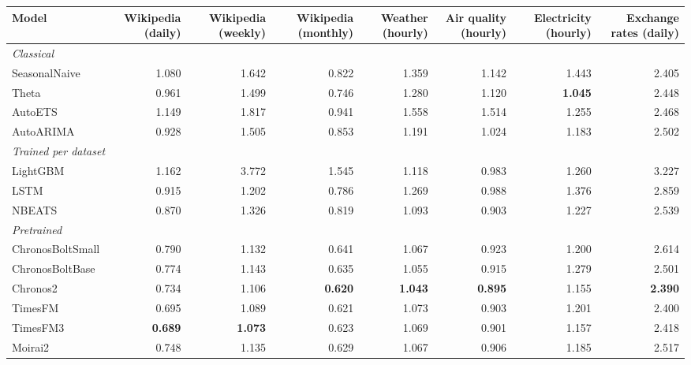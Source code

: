 \begin{tabular}{lrrrrrrr}
\toprule
Model & Wikipedia (daily) & Wikipedia (weekly) & Wikipedia (monthly) & Weather (hourly) & Air quality (hourly) & Electricity (hourly) & Exchange rates (daily) \\
\midrule
\multicolumn{8}{l}{\emph{Classical}} \\
\quad SeasonalNaive & 1.080 & 1.642 & 0.822 & 1.359 & 1.142 & 1.443 & 2.405 \\
\quad Theta & 0.961 & 1.499 & 0.746 & 1.280 & 1.120 & \textbf{1.045} & 2.448 \\
\quad AutoETS & 1.149 & 1.817 & 0.941 & 1.558 & 1.514 & 1.255 & 2.468 \\
\quad AutoARIMA & 0.928 & 1.505 & 0.853 & 1.191 & 1.024 & 1.183 & 2.502 \\
\multicolumn{8}{l}{\emph{Trained per dataset}} \\
\quad LightGBM & 1.162 & 3.772 & 1.545 & 1.118 & 0.983 & 1.260 & 3.227 \\
\quad LSTM & 0.915 & 1.202 & 0.786 & 1.269 & 0.988 & 1.376 & 2.859 \\
\quad NBEATS & 0.870 & 1.326 & 0.819 & 1.093 & 0.903 & 1.227 & 2.539 \\
\multicolumn{8}{l}{\emph{Pretrained}} \\
\quad ChronosBoltSmall & 0.790 & 1.132 & 0.641 & 1.067 & 0.923 & 1.200 & 2.614 \\
\quad ChronosBoltBase & 0.774 & 1.143 & 0.635 & 1.055 & 0.915 & 1.279 & 2.501 \\
\quad Chronos2 & 0.734 & 1.106 & \textbf{0.620} & \textbf{1.043} & \textbf{0.895} & 1.155 & \textbf{2.390} \\
\quad TimesFM & 0.695 & 1.089 & 0.621 & 1.073 & 0.903 & 1.201 & 2.400 \\
\quad TimesFM3 & \textbf{0.689} & \textbf{1.073} & 0.623 & 1.069 & 0.901 & 1.157 & 2.418 \\
\quad Moirai2 & 0.748 & 1.135 & 0.629 & 1.067 & 0.906 & 1.185 & 2.517 \\
\bottomrule
\end{tabular}
